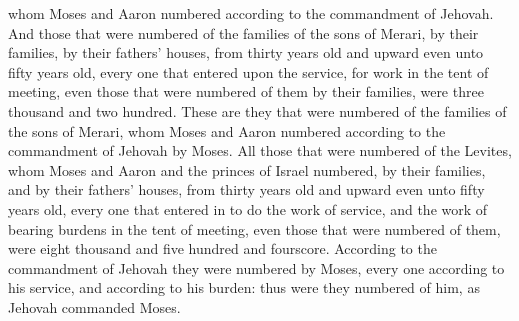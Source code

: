 whom Moses and Aaron numbered according to the commandment of Jehovah.  And those that were numbered of the families of the sons of Merari, by their families, by their fathers’ houses, from thirty years old and upward even unto fifty years old, every one that entered upon the service, for work in the tent of meeting, even those that were numbered of them by their families, were three thousand and two hundred. These are they that were numbered of the families of the sons of Merari, whom Moses and Aaron numbered according to the commandment of Jehovah by Moses.  All those that were numbered of the Levites, whom Moses and Aaron and the princes of Israel numbered, by their families, and by their fathers’ houses, from thirty years old and upward even unto fifty years old, every one that entered in to do the work of service, and the work of bearing burdens in the tent of meeting, even those that were numbered of them, were eight thousand and five hundred and fourscore. According to the commandment of Jehovah they were numbered by Moses, every one according to his service, and according to his burden: thus were they numbered of him, as Jehovah commanded Moses. 


